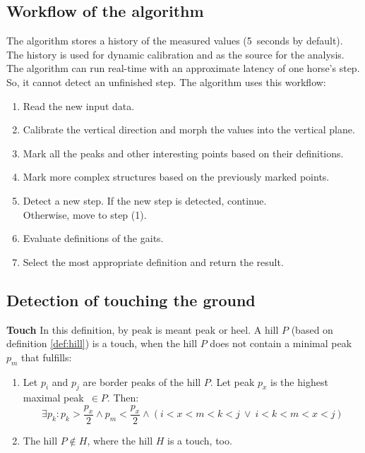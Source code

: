 \subsection{Workflow of the algorithm}
The algorithm stores a history of the measured values (5~seconds by default). The history is used for dynamic calibration and as the source for the analysis. The algorithm can run real-time with an approximate latency of one horse's step. So, it cannot detect an unfinished step. The algorithm uses this workflow:
\begin{enumerate}
    \item Read the new input data.
    \item Calibrate the vertical direction and morph the values into the vertical plane.
    \item Mark all the peaks and other interesting points based on their definitions.
    \item Mark more complex structures based on the previously marked points.
    \item Detect a new step. If the new step is detected, continue.\\Otherwise, move to step (1).
    \item Evaluate definitions of the gaits.
    \item Select the most appropriate definition and return the result.
\end{enumerate}

\subsection{Detection of touching the ground}
\begin{definition}{\textbf{Touch}}
    \label{def:touch}
    In this definition, by peak is meant peak or heel. A hill $P$ (based on definition \ref{def:hill}) is a touch, when the hill $P$ does not contain a minimal peak $p_m$ that fulfills:
    \begin{enumerate}
        \item Let $p_i$ and $p_j$ are border peaks of the hill $P$. Let peak $p_x$ is the highest maximal peak~$\in P$. Then:
        $$\exists p_k : p_k > \dfrac{p_x}{2} \land p_m < \dfrac{p_x}{2} \land (i < x < m < k < j \:\lor\: i < k < m < x < j)$$
        \item The hill $P \notin H$, where the hill $H$ is a touch, too.
    \end{enumerate}
\end{definition}

